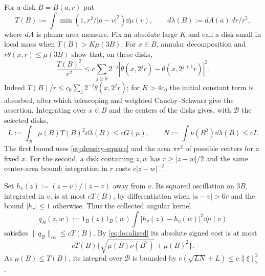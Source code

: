 For a disk $B=B(a,r)$ put
\[
 T(B):=\int\min(1,r^2/|a-v|^2)\dd\mu(v),\qquad
 d\lambda(B):=dA(a)\,dr/r^5,
\]
where $dA$ is planar area measure.
Fix an absolute large $K$ and call a disk small in local mass when $T(B)>K\mu(3B)$.
For $x\in B$, annular decomposition and $r\theta(x,r)\le\mu(3B)$ show that, on these disks,
\[
 \frac{T(B)^2}{r^2}
 \le c\sum_{j\ge0}2^{-j}|\theta(x,2^jr)-\theta(x,2^{j+1}r)|^2.
\]
Indeed $T(B)/r\le c_0\sum_j2^{-j}\theta(x,2^jr)$; for $K>4c_0$ the initial constant term is absorbed, after which telescoping and weighted Cauchy--Schwarz give the assertion.
Integrating over $x\in B$ and the centers of the disks gives, with $\mathcal B$ the selected disks,
\begin{equation}\label{eq:small-budgets}
 L:=\int_{\mathcal B}\mu(B)T(B)^2\dd\lambda(B)\le cG(\mu),\qquad
 N:=\int\nu(B^2)\dd\lambda(B)\le cI.
\end{equation}
The first bound uses \eqref{eq:density-square} and the area $\pi r^2$ of possible centers for a fixed $x$.
For the second, a disk containing $z,w$ has $r\ge|z-w|/2$ and the same center-area bound; integration in $r$ costs $c|z-w|^{-2}$.

Set $h_v(z):=(z-v)/(\bar z-\bar v)$ away from $v$.
Its squared oscillation on $3B$, integrated in $v$, is at most $cT(B)$, by differentiation when $|a-v|>6r$ and the bound $|h_v|\le1$ otherwise.
Thus the collected angular kernel
\[
 q_B(z,w):=1_B(z)1_B(w)\int|h_v(z)-h_v(w)|^2\dd\mu(v)
\]
satisfies $\|q_B\|_\infty\le cT(B)$.
By \eqref{eq:localized} its absolute signed cost is at most
\[
 cT(B)\{\sqrt{\mu(B)\nu(B^2)}+\mu(B)^2\}.
\]
As $\mu(B)\le T(B)$, its integral over $\mathcal B$ is bounded by $c(\sqrt{LN}+L)\le c\|\xi\|_2^2$.

